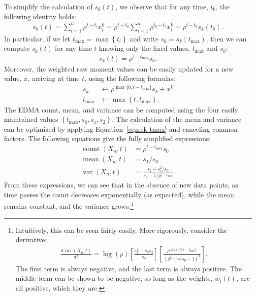 \documentclass{article}
\DeclareMathOperator{\cnt}{count}
\DeclareMathOperator{\mean}{mean}
\DeclareMathOperator{\var}{var}
\newcommand{\tmax}{{t_\text{max}}}
\begin{document}
To simplify the calculation of $s_k(t)$, we observe that for any time, $t_0$, the following identity holds:
\begin{align}
s_k(t)
= \sum_{i=1}^{n}{\rho^{t-t_i} x_i^k}
= \rho^{t-t_0} \sum_{i=1}^{n}{\rho^{t_0-t_i} x_i^k} 
= \rho^{t-t_0} s_k(t_0).
\end{align}
In particular, if we let $\tmax=\max\left\{t_i\right\}$ and write $s_k=s_k(\tmax)$, then we can compute $s_k(t)$ for any time $t$ knowing only the fixed values, $\tmax$ and $s_k$:
\begin{align}
\label{eqn:sk-tmax}
s_k(t) = \rho^{t-\tmax} s_k.
\end{align}
Moreover, the weighted raw moment values can be easily updated for a new value, $x$, arriving at time $t$, using the following formulas:
\begin{align}
s_k &\leftarrow \rho^{\max\{0,t-\tmax\}} s_k + x^k \\
\tmax &\leftarrow \max\left\{t,\tmax\right\}.
\end{align}
The EDMA count, mean, and variance can be computed using the four easily maintained values $\left\{\tmax,s_0,s_1,s_2\right\}$. The calculation of the mean and variance can be optimized by applying Equation~\ref{eqn:sk-tmax} and canceling common factors. The following equations give the fully simplified expressions:
\begin{align}
\cnt(X_n,t) &= \rho^{t-\tmax} s_0 \\
\mean(X_n,t) &= s_1/s_0 \\
\var(X_n,t) &= \frac{s_2 - s_1^2/s_0}{s_0-1/\rho^{t-\tmax}}.
\end{align}
From these expressions, we can see that in the absence of new data points, as time passes the count decreases exponentially (as expected), while the mean remains constant, and the variance grows.\footnote{Intuitively, this can be seen fairly easily. More rigorously, consider the derivative:
\begin{align}
\frac{d \var(X_n,t)}{d t} =
	\log(\rho)
	\left[ \frac{s_1^2 - s_0 s_2}{s_0} \right]
	\left[ \frac{\rho^{\max\{0,t-\tmax\}}}{(\rho^{t-\tmax} s_0 - 1)^2} \right].
\end{align}
The first term is always negative, and the last term is always positive. The middle term can be shown to be negative, so long as the weights, $w_i(t)$, are all positive, which they are.
}
\end{document}
